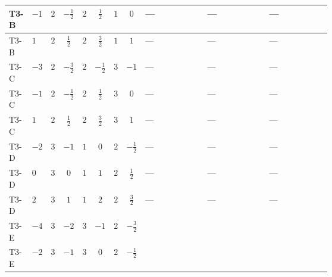\documentclass[8pt]{article}
\begin{document}
\begin{landscape}
\begin{longtable}{@{}llcccccc >{\raggedright\arraybackslash}p{0.21\linewidth} >{\raggedright\arraybackslash}p{0.21\linewidth} >{\raggedright\arraybackslash}p{0.21\linewidth}@{}}
\midrule
T3-B & $-1$ & $2$ & $-\frac{1}{2}$ & $2$ & $\frac{1}{2}$ & $1$ & $0$ & --- & --- & --- \\
\midrule
T3-B & $1$ & $2$ & $\frac{1}{2}$ & $2$ & $\frac{3}{2}$ & $1$ & $1$ & --- & --- & --- \\
\midrule
T3-C & $-3$ & $2$ & $-\frac{3}{2}$ & $2$ & $-\frac{1}{2}$ & $3$ & $-1$ & --- & --- & --- \\
\midrule
T3-C & $-1$ & $2$ & $-\frac{1}{2}$ & $2$ & $\frac{1}{2}$ & $3$ & $0$ & --- & --- & --- \\
\midrule
T3-C & $1$ & $2$ & $\frac{1}{2}$ & $2$ & $\frac{3}{2}$ & $3$ & $1$ & --- & --- & --- \\
\midrule
T3-D & $-2$ & $3$ & $-1$ & $1$ & $0$ & $2$ & $-\frac{1}{2}$ & --- & --- & --- \\
\midrule
T3-D & $0$ & $3$ & $0$ & $1$ & $1$ & $2$ & $\frac{1}{2}$ & --- & --- & --- \\
\midrule
T3-D & $2$ & $3$ & $1$ & $1$ & $2$ & $2$ & $\frac{3}{2}$ & --- & --- & --- \\
\midrule
T3-E & $-4$ & $3$ & $-2$ & $3$ & $-1$ & $2$ & $-\frac{3}{2}$ & \scriptsize\adjustbox{max width=\linewidth}{$\begin{gathered} {\lambda_{12}^{(1)}} \left(\frac{1}{2} T_{\nu}^{(1)}+\frac{1}{2} T_{\nu}^{(2)}+8 {\lambda_{12}^{(\times)}}+{\lambda_{S_1}^{(A)}}+{\lambda_{S_2}^{(A)}}\right)\end{gathered}$} & \scriptsize\adjustbox{max width=\linewidth}{$\begin{gathered} +{\lambda_{12}^{(\times)}} (2 T_{\nu}^{(1)}+2 T_{\nu}^{(2)})\end{gathered}$} & \scriptsize\adjustbox{max width=\linewidth}{$\begin{gathered} -\frac{7}{6} \operatorname{Tr}\!\left({y_1}\,\left({y_1}\right)^{\dagger}\,{y_2}\,\left({y_2}\right)^{\dagger}\right)\end{gathered}$} \\
\midrule
T3-E & $-2$ & $3$ & $-1$ & $3$ & $0$ & $2$ & $-\frac{1}{2}$ & \scriptsize\adjustbox{max width=\linewidth}{$\begin{gathered} {\lambda_{12}^{(1)}} \left(\frac{1}{2} T_{\nu}^{(1)}+\frac{1}{2} T_{\nu}^{(2)}+8 {\lambda_{12}^{(\times)}}+{\lambda_{S_1}^{(A)}}+{\lambda_{S_2}^{(A)}}\right)\end{gathered}$} & \scriptsize\adjustbox{max width=\linewidth}{$\begin{gathered} +{\lambda_{12}^{(\times)}} (2 T_{\nu}^{(1)}+2 T_{\nu}^{(2)})\end{gathered}$} & \scriptsize\adjustbox{max width=\linewidth}{$\begin{gathered} -\frac{7}{6} \operatorname{Tr}\!\left({y_1}\,\left({y_1}\right)^{\dagger}\,{y_2}\,\left({y_2}\right)^{\dagger}\right)\end{gathered}$} \\

\end{longtable}
\end{landscape}
\end{document}
